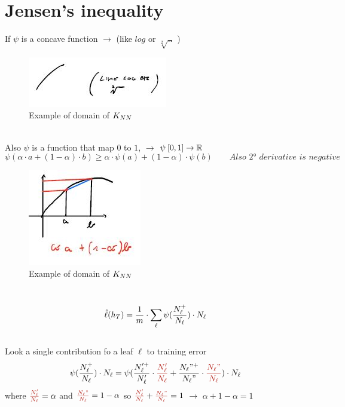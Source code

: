 \documentclass[../main.tex]{subfiles}
\begin{document}
\section{Jensen’s inequality}
If $\psi$ is a concave function $\longrightarrow $ (like $log$ or $\sqrt[2]{..}$ )
\\
\begin{figure}[h]
    \centering
    \includegraphics[width=0.4\linewidth]{../img/lez5-img3.JPG}
    \caption{Example of domain of $K_{NN}$}
\end{figure}
\\
Also $\psi$ is a function that map $0$ to $1$, \quad $\longrightarrow$ \quad $\psi\:[0,1]\rightarrow \mathbb{R}$\\
$$
\psi(\alpha \cdot a + (1-\alpha) \cdot b ) \geq \alpha \cdot \psi(a) + (1-\alpha) \cdot \psi(b)
\qquad \textit{Also 2° derivative is negative}$$
\begin{figure}[h]
    \centering
    \includegraphics[width=0.5\linewidth]{../img/lez5-img4.JPG}
    \caption{Example of domain of $K_{NN}$}
\end{figure}
\\
$$ \hat{\ell}(h_T) = \frac{1}{m} \cdot \sum_{\ell}{} \psi  (\frac{N_{\ell}^+}{N_{\ell}}) \cdot N_{\ell}
$$
\\
Look  a single contribution fo a leaf $\ell$ to training error
\\
$$
\psi(\frac{\nl^+}{\nl}) \cdot \nl = \psi(\frac{\nl'^+}{\nl'} \cdot \red{\frac{\nl'}{\nl}} + \frac{\nl"^+}{\nl"} \cdot \red{\frac{\nl"}{\nl}}) \cdot \nl
$$
where $\red{\frac{\nl'}{\nl}} = \alpha$ and $\red{\frac{\nl"}{\nl}} = 1-\alpha$ \qquad so \quad $\red{\frac{\nl'}{\nl}} + \red{\frac{\nl"}{\nl}} = 1$ \qquad $\longrightarrow$ $\alpha + 1 -\alpha = 1$
\end{document}
